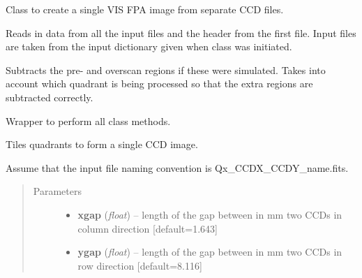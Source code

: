 \documentclass[a4paper,11pt,english]{sphinxmanual}
\begin{document}
\begin{fulllineitems}
\label{postproc:postproc.tileFPA.tileFPA}
Class to create a single VIS FPA image from separate CCD files.

\begin{fulllineitems}
\label{postproc:postproc.tileFPA.tileFPA.readData}
Reads in data from all the input files and the header from the first file.
Input files are taken from the input dictionary given when class was initiated.

Subtracts the pre- and overscan regions if these were simulated. Takes into account
which quadrant is being processed so that the extra regions are subtracted correctly.

\end{fulllineitems}


\begin{fulllineitems}
\label{postproc:postproc.tileFPA.tileFPA.runAll}
Wrapper to perform all class methods.

\end{fulllineitems}


\begin{fulllineitems}
\label{postproc:postproc.tileFPA.tileFPA.tileFPA}
Tiles quadrants to form a single CCD image.

Assume that the input file naming convention is Qx\_CCDX\_CCDY\_name.fits.
\begin{quote}\begin{description}
\item[{Parameters}] \leavevmode\begin{itemize}
\item {} 
\textbf{xgap} (\emph{float}) -- length of the gap between in mm two CCDs in column direction {[}default=1.643{]}

\item {} 
\textbf{ygap} (\emph{float}) -- length of the gap between in mm two CCDs in row direction {[}default=8.116{]}


\end{itemize}
\end{description}
\end{quote}
\end{fulllineitems}
\end{fulllineitems}
\end{document}
